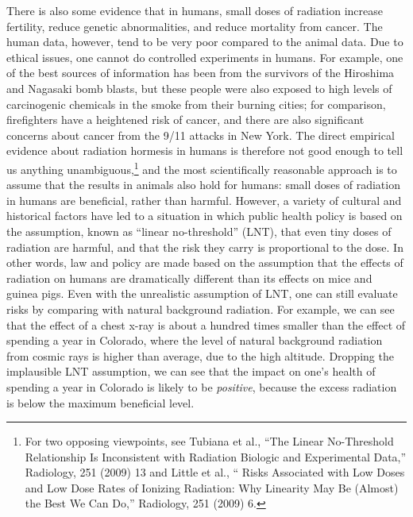 There is also some evidence that in humans, small doses of radiation increase fertility, reduce genetic abnormalities,
and reduce mortality from cancer. The human data, however, tend to be very poor compared to the animal data.
Due to ethical issues, one cannot do controlled experiments in humans. For example, one of the best sources of
information has been from the survivors of the Hiroshima and Nagasaki bomb blasts, but these people were also
exposed to high levels of carcinogenic chemicals in the smoke from their burning cities; for comparison, firefighters
have a heightened risk of cancer, and there are also significant concerns about cancer from the 9/11 attacks in New York.
The direct empirical evidence about radiation hormesis in humans is therefore not good enough to tell us
anything unambiguous,\footnote{For two opposing viewpoints, see Tubiana et al., ``The Linear No-Threshold Relationship 
Is Inconsistent with Radiation Biologic and Experimental Data,'' Radiology, 251 (2009) 13 and
Little et al., `` Risks Associated with Low Doses and Low Dose Rates of Ionizing Radiation: Why Linearity May Be (Almost) the Best We Can Do,''
Radiology, 251 (2009) 6.} and the most scientifically reasonable approach is to assume that the results in animals
also hold for humans: small doses of radiation in humans are beneficial, rather than harmful. However,
a variety of cultural and historical factors have led to a situation in which public health policy is based
on the assumption, known as ``linear no-threshold'' (LNT),
that even tiny doses of radiation are harmful, and that the risk they carry is proportional
to the dose. In other words, law and policy are made based on the assumption that the effects of radiation
on humans are dramatically different than its effects on mice and guinea pigs. Even with the unrealistic assumption of LNT,
one can still evaluate risks by comparing with natural background radiation. For example, we can see that the effect
of a chest x-ray is about a hundred times smaller than the effect of spending a year in Colorado, where the level of natural
background radiation from cosmic rays is higher than average, due to the high altitude.
Dropping the implausible LNT assumption, we can see that the impact on one's health of spending a year in Colorado is likely to be
\emph{positive}, because the excess radiation is below the maximum beneficial level.

